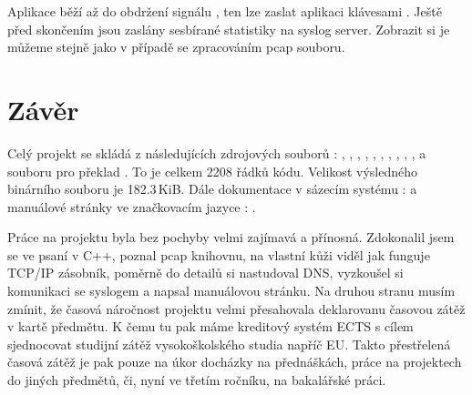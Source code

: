 \documentclass[11pt, a4paper, titlepage]{article}
\begin{document}
\begin{center}
\end{center}

\scriptsize






\normalsize

\medskip

Aplikace běží až do obdržení signálu , ten lze zaslat aplikaci klávesami . Ještě před skončením jsou zaslány sesbírané statistiky na syslog server. Zobrazit si je můžeme stejně jako v případě se zpracováním pcap souboru.

\newpage


\section{Závěr}

Celý projekt se skládá z následujících zdrojových souborů : , , , , , , , , , ,  a souboru pro překlad . To je celkem 2208 řádků kódu. Velikost výsledného binárního souboru  je 182.3\,KiB. Dále dokumentace v sázecím systému :  a manuálové stránky ve značkovacím jazyce : .
\bigskip

Práce na projektu byla bez pochyby velmi zajímavá a přínosná. Zdokonalil jsem se ve psaní v C++, poznal pcap knihovnu, na vlastní kůži viděl jak funguje TCP/IP zásobník, poměrně do detailů si nastudoval DNS, vyzkoušel si komunikaci se syslogem a napsal manuálovou stránku. Na druhou stranu musím zmínit, že časová náročnost projektu velmi přesahovala deklarovanu časovou zátěž v kartě předmětu. K čemu tu pak máme kreditový systém ECTS s cílem sjednocovat studijní zátěž vysokoškolského studia napříč EU. Takto přestřelená časová zátěž je pak pouze na úkor docházky na přednáškách, práce na projektech do jiných předmětů, či, nyní ve třetím ročníku, na bakalářské práci.
\end{document}
